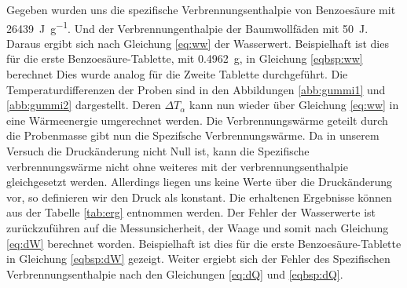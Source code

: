 Gegeben wurden uns die spezifische Verbrennungsenthalpie von Benzoesäure mit \qty{26439}{\joule\per\gram}.
Und der Verbrennungenthalpie der Baumwollfäden mit \qty{50}{\joule}.
Daraus ergibt sich nach Gleichung \ref{eq:ww} der Wasserwert.
Beispielhaft ist dies für die erste Benzoesäure-Tablette, mit \qty{0,4962}{\gram}, in Gleichung \ref{eqbsp:ww} berechnet
Dies wurde analog für die Zweite Tablette durchgeführt.
Die Temperaturdifferenzen der Proben sind in den Abbildungen \ref{abb:gummi1} und \ref{abb:gummi2} dargestellt.
Deren $\Delta T_\alpha$ kann nun wieder über Gleichung \ref{eq:ww} in eine Wärmeenergie umgerechnet werden.
Die Verbrennungswärme geteilt durch die Probenmasse gibt nun die Spezifsche Verbrennungswärme. 
Da in unserem Versuch die Druckänderung nicht Null ist, kann die Spezifische verbrennungswärme nicht ohne weiteres mit der verbrennungsenthalpie gleichgesetzt werden.
Allerdings liegen uns keine Werte über die Druckänderung vor, so definieren wir den Druck als konstant.
Die erhaltenen  Ergebnisse können aus der Tabelle \ref{tab:erg} entnommen werden.
Der Fehler der Wasserwerte ist zurückzuführen auf die Messunsicherheit, der Waage und somit nach Gleichung \ref{eq:dW} berechnet worden.
Beispielhaft ist dies für die erste Benzoesäure-Tablette in Gleichung \ref{eqbsp:dW} gezeigt.
Weiter ergiebt sich der Fehler des Spezifischen Verbrennungsenthalpie nach den Gleichungen \ref{eq:dQ} und \ref{eqbsp:dQ}.
